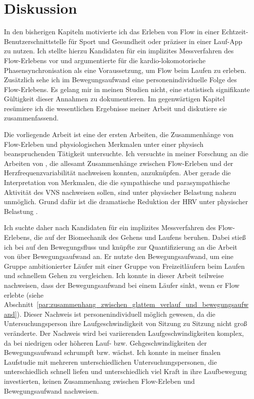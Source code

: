 \chapter{Diskussion}
\label{cha:diskussion}
In den bisherigen Kapiteln motivierte ich das Erleben von Flow in einer Echtzeit-Benutzerschnittstelle für Sport und Gesundheit oder präziser in einer Lauf-App zu nutzen. Ich stellte hierzu Kandidaten für ein implizites Messverfahren des Flow-Erlebens vor und argumentierte für die kardio-lokomotorische Phasensynchronisation als eine Voraussetzung, um Flow beim Laufen zu erleben. Zusätzlich sehe ich im Bewegungsaufwand eine personenindividuelle Folge des Flow-Erlebens. Es gelang mir in meinen Studien nicht, eine statistisch signifikante Gültigkeit dieser Annahmen zu dokumentieren. Im gegenwärtigen Kapitel resümiere ich die wesentlichen Ergebnisse meiner Arbeit und diskutiere sie zusammenfassend. 

Die vorliegende Arbeit ist eine der ersten Arbeiten, die Zusammenhänge von Flow-Erleben und physiologischen Merkmalen unter einer physisch beanspruchenden Tätigkeit untersuchte. Ich versuchte in meiner Forschung an die Arbeiten von \citet{deManzano2010, Keller2011, Gaggioli2013, Peifer2014, Tozman2015}, die allesamt Zusammenhänge zwischen Flow-Erleben und der Herzfrequenzvariabilität nachweisen konnten, anzuknüpfen. Aber gerade die Interpretation von Merkmalen, die die sympathische und parasympathische Aktivität des \ac{VNS} nachweisen sollen, sind unter physischer Belastung nahezu unmöglich. Grund dafür ist die dramatische Reduktion der \ac{HRV} unter physischer Belastung \citep[vgl.][]{Hoos2010}. 

Ich suchte daher nach Kandidaten für ein implizites Messverfahren des Flow-Erlebens, die auf der Biomechanik des Gehens und Laufens beruhen. Dabei stieß ich bei \citet[][S.~121]{Meinel2007} auf den Bewegungsfluss und knüpfte zur Quantifizierung an die Arbeit von \citet{Hreljac2000} über Bewegungsaufwand an. Er nutzte den Bewegungsaufwand, um eine Gruppe ambitionierter Läufer mit einer Gruppe von Freizeitläufern beim Laufen und schnellem Gehen zu vergleichen. Ich konnte in dieser Arbeit teilweise nachweisen, dass der Bewegungsaufwand bei einem Läufer sinkt, wenn er Flow erlebte (siehe Abschnitt~\ref{par:zusammenhang_zwischen_glattem_verlauf_und_bewegungsaufwand}). Dieser Nachweis ist personenindividuell möglich gewesen, da die Untersuchungsperson ihre Laufgeschwindigkeit von Sitzung zu Sitzung nicht groß veränderte. Der Nachweis wird bei variierenden Laufgeschwindigkeiten komplex, da bei niedrigen oder höheren Lauf- bzw. Gehgeschwindigkeiten der Bewegungsaufwand schrumpft bzw. wächst. Ich konnte in meiner finalen Laufstudie mit mehreren unterschiedlichen Untersuchungspersonen, die unterschiedlich schnell liefen und unterschiedlich viel Kraft in ihre Laufbewegung investierten, keinen Zusammenhang zwischen Flow-Erleben und Bewegungsaufwand nachweisen. 

